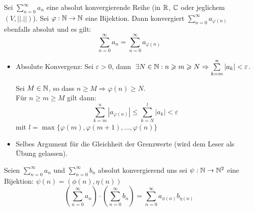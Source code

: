 \documentclass[main.tex]{subfiles}
\begin{document}
\begin{Theorem}
  Sei $\sum \limits_{n=0}^\infty a_n$ eine absolut konvergierende Reihe (in $\mathbb{R}$, $\mathbb{C}$ oder jeglichem $(V,||.||)$). Sei $\varphi: \mathbb{N} \to \mathbb{N}$ eine Bijektion. Dann konvergiert $\sum \limits_{n=0}^\infty a_{\varphi(n)}$ ebenfalls absolut und es gilt:
  $$\sum \limits_{n=0}^\infty a_n = \sum \limits_{n=0}^\infty a_{\varphi(n)}$$
\end{Theorem}

\begin{Beweis}
  \begin{itemize}
    \item Absolute Konvergenz: Sei $\varepsilon > 0$, dann $\;\exists N \in  \mathbb{N} : n \geqslant m \geqslant N \Rightarrow \sum \limits_{k=m}^n |a_k| < \varepsilon$.

      Sei $M \in \mathbb{N}$, so dass $n \geq M \Rightarrow \varphi(n) \geq N$.\\
      Für $n \geq m \geq M$ gilt dann:
      $$\sum \limits_{k=m}^n |a_{\varphi(n)}| \leq \sum \limits_{k=N}^l|a_k| < \varepsilon$$
      mit $l = \max\{\varphi(m),\varphi(m+1),...,\varphi(n)\}$
    \item Selbes Argument für die Gleichheit der Grenzwerte (wird dem Leser als Übung gelassen).
  \end{itemize}
\end{Beweis}

\begin{Korollar}
  Seien $\sum \limits_{n=0}^\infty a_n$ und $\sum \limits_{n=0}^\infty b_n$ absolut konvergierend uns sei $\psi : \mathbb{N} \to \mathbb{N}^2$ eine Bijektion: $\psi(n) = (\phi(n),\eta(n))$
  $$\left(\sum \limits_{n=0}^\infty a_n\right) \cdot \left(\sum \limits_{n=0}^\infty b_n\right) = \sum \limits_{n=0}^\infty a_{\phi(n)} b_{\eta(n)}$$
\end{Korollar}
\end{document}
